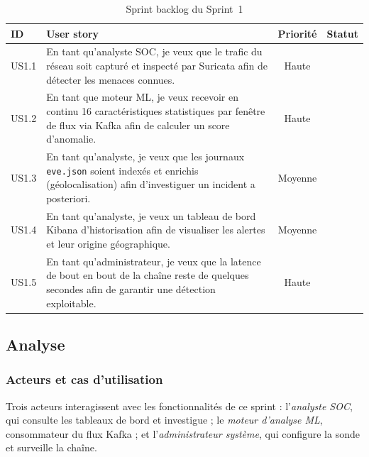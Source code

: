 \begin{table}[H]
\centering
\caption{Sprint backlog du Sprint~1}
\label{tab:backlog-s1}
\small
\begin{tabularx}{\textwidth}{@{}l>{\raggedright\arraybackslash}Xcc@{}}
\toprule
\textbf{ID} & \textbf{User story} & \textbf{Priorité} & \textbf{Statut} \\
\midrule
US1.1 & En tant qu'analyste SOC, je veux que le trafic du réseau soit capturé et inspecté par Suricata afin de détecter les menaces connues. & Haute & \A{statut} \\
US1.2 & En tant que moteur ML, je veux recevoir en continu 16 caractéristiques statistiques par fenêtre de flux via Kafka afin de calculer un score d'anomalie. & Haute & \A{statut} \\
US1.3 & En tant qu'analyste, je veux que les journaux \texttt{eve.json} soient indexés et enrichis (géolocalisation) afin d'investiguer un incident a posteriori. & Moyenne & \A{statut} \\
US1.4 & En tant qu'analyste, je veux un tableau de bord Kibana d'historisation afin de visualiser les alertes et leur origine géographique. & Moyenne & \A{statut} \\
US1.5 & En tant qu'administrateur, je veux que la latence de bout en bout de la chaîne reste de quelques secondes afin de garantir une détection exploitable. & Haute & \A{statut} \\
\bottomrule
\end{tabularx}
\end{table}


\subsection{Analyse}

\subsubsection{Acteurs et cas d'utilisation}

Trois acteurs interagissent avec les fonctionnalités de ce sprint : l'\emph{analyste SOC}, qui consulte les tableaux de bord et investigue ; le \emph{moteur d'analyse ML}, consommateur du flux Kafka ; et l'\emph{administrateur système}, qui configure la sonde et surveille la chaîne.

